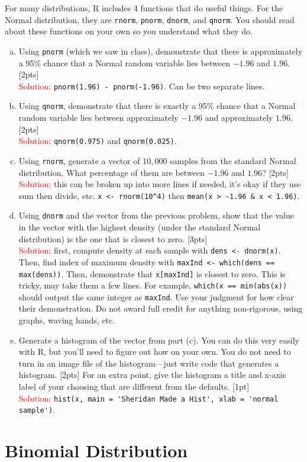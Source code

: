 \documentclass[12pt]{article}
\newcommand{\ans}{\\\textcolor{red}{Solution: }}
\begin{document}
For many distributions, R includes 4 functions that do useful things. For the Normal distribution, they are \verb|rnorm|, \verb|pnorm|, \verb|dnorm|, and \verb|qnorm|. You should read about these functions on your own so you understand what they do.

\begin{enumerate}[(a)]
	\item Using \verb|pnorm| (which we saw in class), demonstrate that there is approximately a 95\% chance that a Normal random variable lies between $-1.96$ and $1.96$. [2pts] \ans \verb|pnorm(1.96) - pnorm(-1.96)|. Can be two separate lines.
	\item Using \verb|qnorm|, demonstrate that there is exactly a 95\% chance that a Normal random variable lies between approximately $-1.96$ and approximately $1.96$. [2pts] \ans \verb|qnorm(0.975)| and \verb|qnorm(0.025)|.
	\item Using \verb|rnorm|, generate a vector of $10,000$ samples from the standard Normal distribution. What percentage of them are between $-1.96$ and $1.96$? [2pts] \ans this can be broken up into more lines if needed, it's okay if they use sum then divide, etc. \verb|x <- rnorm(10^4)| then \verb|mean(x > -1.96 & x < 1.96)|.
	\item Using \verb|dnorm| and the vector from the previous problem, show that the value in the vector with the highest density (under the standard Normal distribution) is the one that is closest to zero. [3pts] \ans first, compute density at each sample with \verb|dens <- dnorm(x)|. Then, find index of maximum density with \verb|maxInd <- which(dens == max(dens))|. Then, demonstrate that \verb|x[maxInd]| is closest to zero. This is tricky, may take them a few lines. For example, \verb|which(x == min(abs(x))| should output the same integer as \verb|maxInd|. Use your judgment for how clear their demonstration. Do not award full credit for anything non-rigorous, using graphs, waving hands, etc.
	\item Generate a histogram of the vector from part (c). You can do this very easily with R, but you'll need to figure out how on your own. You do not need to turn in an image file of the histogram---just write code that generates a histogram. [2pts] For an extra point, give the histogram a title and x-axis label of your choosing that are different from the defaults. [1pt] \ans \verb|hist(x, main = 'Sheridan Made a Hist', xlab = 'normal sample')|.
\end{enumerate}

\section{Binomial Distribution}
\end{document}
